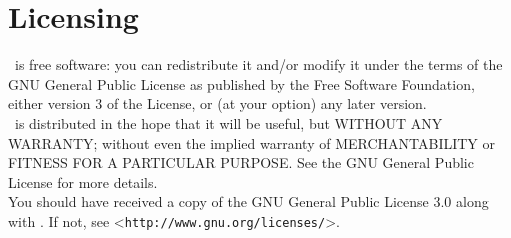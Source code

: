 \chapter*{Licensing}
%
%
%
\packver\ is free software: you can redistribute it and/or modify
it under the terms of the GNU General Public License as published by
the Free Software Foundation, either version 3 of the License, or
(at your option) any later version.\\

\packver\ is distributed in the hope that it will be useful,
but WITHOUT ANY WARRANTY; without even the implied warranty of
MERCHANTABILITY or FITNESS FOR A PARTICULAR PURPOSE.  See the
GNU General Public License for more details.\\

You should have received a copy of the GNU General Public License 3.0
along with \linebreak\packver.  If not, see <\texttt{http://www.gnu.org/licenses/}>.\\

\clearpage
